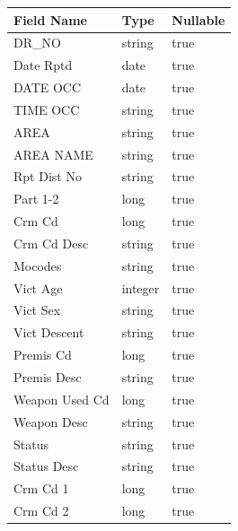 \documentclass{article}
\begin{document}
\begin{table}[h]
\centering
\begin{tabular}{|l|l|l|}
\hline

\textbf{Field Name} & \textbf{Type} & \textbf{Nullable} \\ \hline
DR\_NO               & string        & true              \\ \hline
Date Rptd           & date          & true              \\ \hline
DATE OCC            & date          & true              \\ \hline
TIME OCC            & string        & true              \\ \hline
AREA                & string        & true              \\ \hline
AREA NAME           & string        & true              \\ \hline
Rpt Dist No         & string        & true              \\ \hline
Part 1-2            & long          & true              \\ \hline
Crm Cd              & long          & true              \\ \hline
Crm Cd Desc         & string        & true              \\ \hline
Mocodes             & string        & true              \\ \hline
Vict Age            & integer       & true              \\ \hline
Vict Sex            & string        & true              \\ \hline
Vict Descent        & string        & true              \\ \hline
Premis Cd           & long          & true              \\ \hline
Premis Desc         & string        & true              \\ \hline
Weapon Used Cd      & long          & true              \\ \hline
Weapon Desc         & string        & true              \\ \hline
Status              & string        & true              \\ \hline
Status Desc         & string        & true              \\ \hline
Crm Cd 1            & long          & true              \\ \hline
Crm Cd 2            & long          & true              \\ \hline

\end{tabular}
\end{table}
\end{document}
